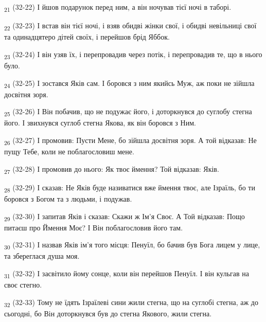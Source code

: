 \begin{tcolorbox}
\textsubscript{21} (32-22) І йшов подарунок перед ним, а він ночував тієї ночі в таборі.
\end{tcolorbox}
\begin{tcolorbox}
\textsubscript{22} (32-23) І встав він тієї ночі, і взяв обидві жінки свої, і обидві невільниці свої та одинадцятеро дітей своїх, і перейшов брід Яббок.
\end{tcolorbox}
\begin{tcolorbox}
\textsubscript{23} (32-24) І він узяв їх, і перепровадив через потік, і перепровадив те, що в нього було.
\end{tcolorbox}
\begin{tcolorbox}
\textsubscript{24} (32-25) І зостався Яків сам. І боровся з ним якийсь Муж, аж поки не зійшла досвітня зоря.
\end{tcolorbox}
\begin{tcolorbox}
\textsubscript{25} (32-26) І Він побачив, що не подужає його, і доторкнувся до суглобу стегна його. І звихнувся суглоб стегна Якова, як він боровся з Ним.
\end{tcolorbox}
\begin{tcolorbox}
\textsubscript{26} (32-27) І промовив: Пусти Мене, бо зійшла досвітня зоря. А той відказав: Не пущу Тебе, коли не поблагословиш мене.
\end{tcolorbox}
\begin{tcolorbox}
\textsubscript{27} (32-28) І промовив до нього: Як твоє ймення? Той відказав: Яків.
\end{tcolorbox}
\begin{tcolorbox}
\textsubscript{28} (32-29) І сказав: Не Яків буде називатися вже ймення твоє, але Ізраїль, бо ти боровся з Богом та з людьми, і подужав.
\end{tcolorbox}
\begin{tcolorbox}
\textsubscript{29} (32-30) І запитав Яків і сказав: Скажи ж Ім'я Своє. А Той відказав: Пощо питаєш про Ймення Моє? І Він поблагословив його там.
\end{tcolorbox}
\begin{tcolorbox}
\textsubscript{30} (32-31) І назвав Яків ім'я того місця: Пенуїл, бо бачив був Бога лицем у лице, та збереглася душа моя.
\end{tcolorbox}
\begin{tcolorbox}
\textsubscript{31} (32-32) І засвітило йому сонце, коли він перейшов Пенуїл. І він кульгав на своє стегно.
\end{tcolorbox}
\begin{tcolorbox}
\textsubscript{32} (32-33) Тому не їдять Ізраїлеві сини жили стегна, що на суглобі стегна, аж до сьогодні, бо Він доторкнувся був до стегна Якового, жили стегна.
\end{tcolorbox}
